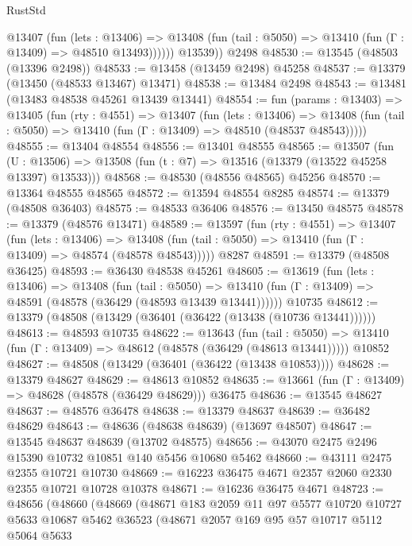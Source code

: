 \begin{lexlean}{RustStd}
\begin{coremodule}
            @13407
              (fun (lets : @13406) =>
              @13408 (fun (tail : @5050) => @13410 (fun (Γ : @13409) => @48510 @13493))))))
        @13539))
    @2498
@48530 := @13545 (@48503 (@13396 @2498))
@48533 := @13458 (@13459 @2498) @45258
@48537 := @13379 (@13450 (@48533 @13467) @13471)
@48538 := @13484 @2498
@48543 := @13481 (@13483 @48538 @45261 @13439 @13441)
@48554 := fun (params : @13403) =>
  @13405
    (fun (rty : @4551) =>
    @13407
      (fun (lets : @13406) =>
      @13408 (fun (tail : @5050) => @13410 (fun (Γ : @13409) => @48510 (@48537 @48543)))))
@48555 := @13404 @48554
@48556 := @13401 @48555
@48565 := @13507
    (fun (U : @13506) => @13508 (fun (t : @7) => @13516 (@13379 (@13522 @45258 @13397) @13533)))
@48568 := @48530 (@48556 @48565) @45256
@48570 := @13364 @48555 @48565
@48572 := @13594 @48554 @8285
@48574 := @13379 (@48508 @36403)
@48575 := @48533 @36406
@48576 := @13450 @48575
@48578 := @13379 (@48576 @13471)
@48589 := @13597
    (fun (rty : @4551) =>
    @13407
      (fun (lets : @13406) =>
      @13408 (fun (tail : @5050) => @13410 (fun (Γ : @13409) => @48574 (@48578 @48543)))))
    @8287
@48591 := @13379 (@48508 @36425)
@48593 := @36430 @48538 @45261
@48605 := @13619
    (fun (lets : @13406) =>
    @13408
      (fun (tail : @5050) =>
      @13410 (fun (Γ : @13409) => @48591 (@48578 (@36429 (@48593 @13439 @13441))))))
    @10735
@48612 := @13379 (@48508 (@13429 (@36401 (@36422 (@13438 (@10736 @13441))))))
@48613 := @48593 @10735
@48622 := @13643
    (fun (tail : @5050) => @13410 (fun (Γ : @13409) => @48612 (@48578 (@36429 (@48613 @13441)))))
    @10852
@48627 := @48508 (@13429 (@36401 (@36422 (@13438 @10853))))
@48628 := @13379 @48627
@48629 := @48613 @10852
@48635 := @13661 (fun (Γ : @13409) => @48628 (@48578 (@36429 @48629))) @36475
@48636 := @13545 @48627
@48637 := @48576 @36478
@48638 := @13379 @48637
@48639 := @36482 @48629
@48643 := @48636 (@48638 @48639) (@13697 @48507)
@48647 := @13545 @48637 @48639 (@13702 @48575)
@48656 := @43070 @2475 @2496 @15390 @10732 @10851 @140 @5456 @10680 @5462
@48660 := @43111 @2475 @2355 @10721 @10730
@48669 := @16223 @36475 @4671 @2357 @2060 @2330 @2355 @10721 @10728 @10378
@48671 := @16236 @36475 @4671
@48723 := @48656
    (@48660
      (@48669
        (@48671
          @183
          @2059
          @11
          @97
          @5577
          @10720
          @10727
          @5633
          @10687
          @5462
          @36523
          (@48671
            @2057
            @169
            @95
            @57
            @10717
            @5112
            @5064
            @5633

\end{coremodule}
\end{lexlean}

